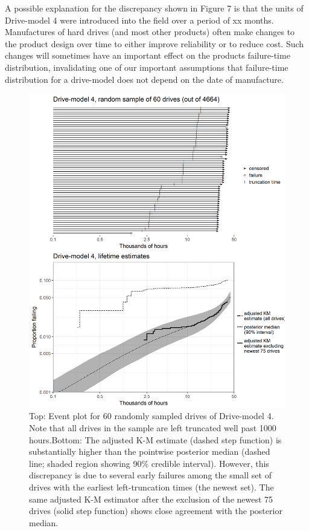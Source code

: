\documentclass[aap]{imsart}
\begin{document}
A possible explanation for the discrepancy shown in Figure 7 is that
the units of Drive-model 4 were introduced into the field over a
period of xx months. Manufactures of hard drives (and most other
products) often make changes to the product design over time to
either improve reliability or to reduce cost. Such changes will
sometimes have an important effect on the products failure-time
distribution, invalidating one of our important assumptions that
failure-time distribution for a drive-model does not depend on the
date of manufacture. 

\begin{figure}
\centering
\includegraphics[height=.8\textheight]{dm4-exception.png}
\caption{\footnotesize Top: Event plot for 60 randomly sampled drives of Drive-model 4. Note that all drives in the sample are left truncated well past 1000 hours.\hspace{\textwidth}Bottom: The adjusted K-M estimate (dashed step function) is substantially higher than the pointwise posterior median (dashed line; shaded region showing 90\% credible interval). However, this discrepancy is due to several early failures among the small set of drives with the earliest left-truncation times (the newest set). The same adjusted K-M estimator after the exclusion of the newest 75 drives (solid step function) shows close agreement with the posterior median.}

\label{fig:ex-mod-4}
\end{figure}
\end{document}
